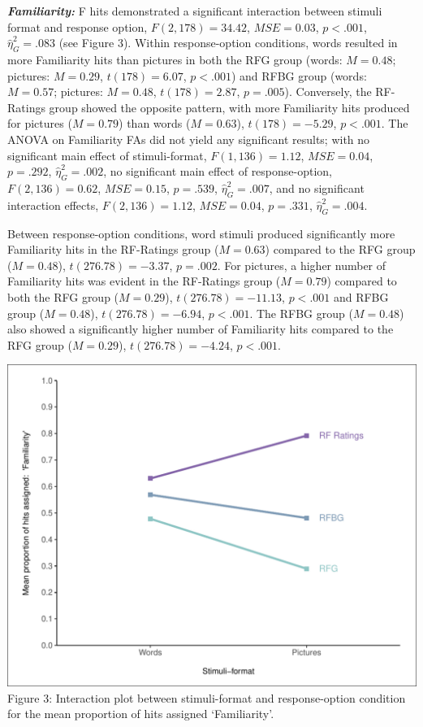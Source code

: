 \documentclass[
  11pt,
]{article}
\begin{document}
\textbf{\emph{Familiarity:}} F hits demonstrated a significant
interaction between stimuli format and response option,
\(F(2, 178) = 34.42\), \(\mathit{MSE} = 0.03\), \(p < .001\),
\(\hat{\eta}^2_G = .083\) (see Figure 3). Within response-option
conditions, words resulted in more Familiarity hits than pictures in
both the RFG group (words: \(M = 0.48\); pictures: \(M = 0.29\),
\(t(178) = 6.07\), \(p < .001\)) and RFBG group (words: \(M = 0.57\);
pictures: \(M = 0.48\), \(t(178) = 2.87\), \(p = .005\)). Conversely,
the RF-Ratings group showed the opposite pattern, with more Familiarity
hits produced for pictures (\(M = 0.79\)) than words (\(M = 0.63\)),
\(t(178) = -5.29\), \(p < .001\). The ANOVA on Familiarity FAs did not
yield any significant results; with no significant main effect of
stimuli-format, \(F(1, 136) = 1.12\), \(\mathit{MSE} = 0.04\),
\(p = .292\), \(\hat{\eta}^2_G = .002\), no significant main effect of
response-option, \(F(2, 136) = 0.62\), \(\mathit{MSE} = 0.15\),
\(p = .539\), \(\hat{\eta}^2_G = .007\), and no significant interaction
effects, \(F(2, 136) = 1.12\), \(\mathit{MSE} = 0.04\), \(p = .331\),
\(\hat{\eta}^2_G = .004\).

Between response-option conditions, word stimuli produced significantly
more Familiarity hits in the RF-Ratings group (\(M = 0.63\)) compared to
the RFG group (\(M = 0.48\)), \(t(276.78) = -3.37\), \(p = .002\). For
pictures, a higher number of Familiarity hits was evident in the
RF-Ratings group (\(M = 0.79\)) compared to both the RFG group
(\(M = 0.29\)), \(t(276.78) = -11.13\), \(p < .001\) and RFBG group
(\(M = 0.48\)), \(t(276.78) = -6.94\), \(p < .001\). The RFBG group
(\(M = 0.48\)) also showed a significantly higher number of Familiarity
hits compared to the RFG group (\(M = 0.29\)), \(t(276.78) = -4.24\),
\(p < .001\).

\includegraphics{R--Thesis_files/figure-latex/unnamed-chunk-15-1.pdf}
Figure 3: Interaction plot between stimuli-format and response-option
condition for the mean proportion of hits assigned `Familiarity'.
\end{document}

